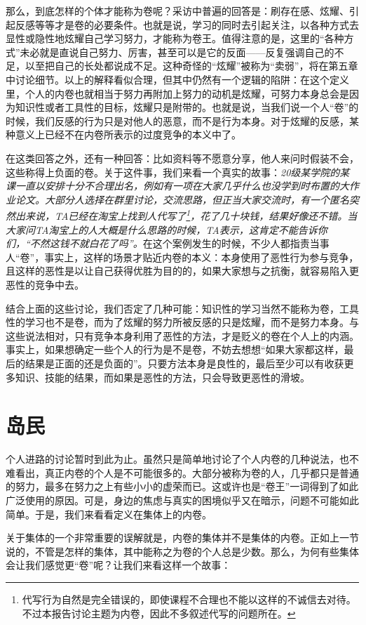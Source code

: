 \documentclass[UTF8,a4paper,fontset=windows,11pt,openany]{ctexbook}
\begin{document}
那么，到底怎样的个体才能称为卷呢？采访中普遍的回答是：刷存在感、炫耀、引起反感等等才是卷的必要条件。也就是说，学习的同时去引起关注，以各种方式去显性或隐性地炫耀自己学习努力，才能称为卷王。值得注意的是，这里的“各种方式”未必就是直说自己努力、厉害，甚至可以是它的反面——反复强调自己的不足，以至把自己的长处都说成不足。这种奇怪的“炫耀”被称为“卖弱”，将在第五章中讨论细节。以上的解释看似合理，但其中仍然有一个逻辑的陷阱：在这个定义里，个人的内卷也就相当于努力再附加上努力的动机是炫耀，可努力本身总会是因为知识性或者工具性的目标，炫耀只是附带的。也就是说，当我们说一个人“卷”的时候，我们反感的行为只是对他人的恶意，而不是行为本身。对于炫耀的反感，某种意义上已经不在内卷所表示的过度竞争的本义中了。

在这类回答之外，还有一种回答：比如资料等不愿意分享，他人来问时假装不会，这些称得上负面的卷。关于这件事，我们来看一个真实的故事：\emph{20级某学院的某课一直以安排十分不合理出名，例如有一项在大家几乎什么也没学到时布置的大作业论文。大部分人选择在群里讨论，交流思路，但正当大家交流时，有一个匿名突然出来说，TA已经在淘宝上找到人代写了\footnote{代写行为自然是完全错误的，即使课程不合理也不能以这样的不诚信去对待。不过本报告讨论主题为内卷，因此不多叙述代写的问题所在。}，花了几十块钱，结果好像还不错。当大家问TA淘宝上的人大概是什么思路的时候，TA表示，这肯定不能告诉你们，“不然这钱不就白花了吗”。}在这个案例发生的时候，不少人都指责当事人“卷”，事实上，这样的场景才贴近内卷的本义：本身使用了恶性行为参与竞争，且这样的恶性是以让自己获得优胜为目的的，如果大家想与之抗衡，就容易陷入更恶性的竞争中去。

结合上面的这些讨论，我们否定了几种可能：知识性的学习当然不能称为卷，工具性的学习也不是卷，而为了炫耀的努力所被反感的只是炫耀，而不是努力本身。与这些说法相对，只有竞争本身利用了恶性的方法，才是贬义的卷在个人上的内涵。事实上，如果想确定一些个人的行为是不是卷，不妨去想想“如果大家都这样，最后的结果是正面的还是负面的”。只要方法本身是良性的，最后至少可以有收获更多知识、技能的结果，而如果是恶性的方法，只会导致更恶性的滑坡。

\section{岛民}
个人进路的讨论暂时到此为止。虽然只是简单地讨论了个人内卷的几种说法，也不难看出，真正内卷的个人是不可能很多的。大部分被称为卷的人，几乎都只是普通的努力，最多在努力之上有些小小的虚荣而已。这或许也是“卷王”一词得到了如此广泛使用的原因。可是，身边的焦虑与真实的困境似乎又在暗示，问题不可能如此简单。于是，我们来看看定义在集体上的内卷。

关于集体的一个非常重要的误解就是，内卷的集体并不是集体的内卷。正如上一节说的，不管是怎样的集体，其中能称之为卷的个人总是少数。那么，为何有些集体会让我们感觉更“卷”呢？让我们来看这样一个故事：
\end{document}
